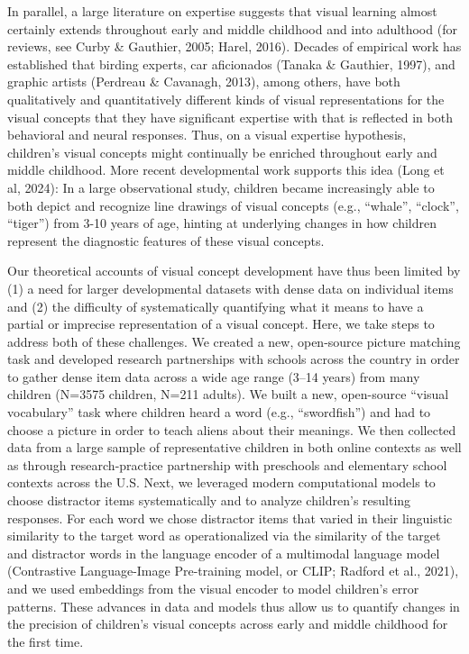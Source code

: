 \documentclass[
  man,mask]{apa6}
\begin{document}
In parallel, a large literature on expertise suggests that visual learning almost certainly extends throughout early and middle childhood and into adulthood (for reviews, see Curby \& Gauthier, 2005; Harel, 2016). Decades of empirical work has established that birding experts, car aficionados (Tanaka \& Gauthier, 1997), and graphic artists (Perdreau \& Cavanagh, 2013), among others, have both qualitatively and quantitatively different kinds of visual representations for the visual concepts that they have significant expertise with that is reflected in both behavioral and neural responses. Thus, on a visual expertise hypothesis, children's visual concepts might continually be enriched throughout early and middle childhood. More recent developmental work supports this idea (Long et al, 2024): In a large observational study, children became increasingly able to both depict and recognize line drawings of visual concepts (e.g., ``whale'', ``clock'', ``tiger'') from 3-10 years of age, hinting at underlying changes in how children represent the diagnostic features of these visual concepts.

Our theoretical accounts of visual concept development have thus been limited by (1) a need for larger developmental datasets with dense data on individual items and (2) the difficulty of systematically quantifying what it means to have a partial or imprecise representation of a visual concept. Here, we take steps to address both of these challenges. We created a new, open-source picture matching task and developed research partnerships with schools across the country in order to gather dense item data across a wide age range (3--14 years) from many children (N=3575 children, N=211 adults). We built a new, open-source ``visual vocabulary'' task where children heard a word (e.g., ``swordfish'') and had to choose a picture in order to teach aliens about their meanings. We then collected data from a large sample of representative children in both online contexts as well as through research-practice partnership with preschools and elementary school contexts across the U.S. Next, we leveraged modern computational models to choose distractor items systematically and to analyze children's resulting responses. For each word we chose distractor items that varied in their linguistic similarity to the target word as operationalized via the similarity of the target and distractor words in the language encoder of a multimodal language model (Contrastive Language-Image Pre-training model, or CLIP; Radford et al., 2021), and we used embeddings from the visual encoder to model children's error patterns. These advances in data and models thus allow us to quantify changes in the precision of children's visual concepts across early and middle childhood for the first time.
\end{document}
